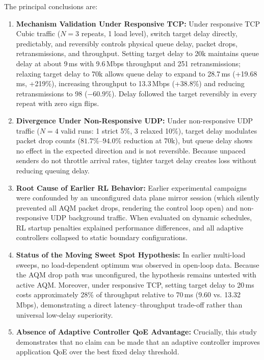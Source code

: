 \documentclass[12pt,a4paper,oneside]{report}
\begin{document}
The principal conclusions are:
\begin{enumerate}[label=\arabic*.]
  \item \textbf{Mechanism Validation Under Responsive TCP:} Under responsive TCP Cubic traffic ($N=3$ repeats, 1 load level), switch target delay directly, predictably, and reversibly controls physical queue delay, packet drops, retransmissions, and throughput. Setting target delay to 20k maintains queue delay at about 9\,ms with 9.6\,Mbps throughput and 251 retransmissions; relaxing target delay to 70k allows queue delay to expand to 28.7\,ms (+19.68\,ms, +219\%), increasing throughput to 13.3\,Mbps (+38.8\%) and reducing retransmissions to 98 ($-60.9\%$). Delay followed the target reversibly in every repeat with zero sign flips.
  \item \textbf{Divergence Under Non-Responsive UDP:} Under non-responsive UDP traffic ($N=4$ valid runs: 1 strict 5\%, 3 relaxed 10\%), target delay modulates packet drop counts ($81.7\%$--$94.0\%$ reduction at 70k), but queue delay shows no effect in the expected direction and is not reversible. Because unpaced senders do not throttle arrival rates, tighter target delay creates loss without reducing queuing delay.
  \item \textbf{Root Cause of Earlier RL Behavior:} Earlier experimental campaigns were confounded by an unconfigured data plane mirror session (which silently prevented all AQM packet drops, rendering the control loop open) and non-responsive UDP background traffic. When evaluated on dynamic schedules, RL startup penalties explained performance differences, and all adaptive controllers collapsed to static boundary configurations.
  \item \textbf{Status of the Moving Sweet Spot Hypothesis:} In earlier multi-load sweeps, no load-dependent optimum was observed in open-loop data. Because the AQM drop path was unconfigured, the hypothesis remains untested with active AQM. Moreover, under responsive TCP, setting target delay to 20\,ms costs approximately 28\% of throughput relative to 70\,ms (9.60 vs. 13.32\,Mbps), demonstrating a direct latency--throughput trade-off rather than universal low-delay superiority.
  \item \textbf{Absence of Adaptive Controller QoE Advantage:} Crucially, this study demonstrates that no claim can be made that an adaptive controller improves application QoE over the best fixed delay threshold.
\end{enumerate}
\end{document}
